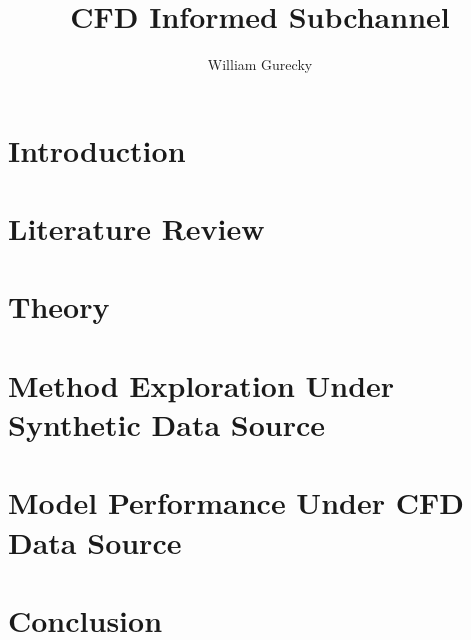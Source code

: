 \documentclass[12pt,a4paper]{report}
\author{William Gurecky}
\title{CFD Informed Subchannel}
\begin{document}








\onehalfspacing
\chapter{Introduction}
\label{chap:intro}


\chapter{Literature Review}
\label{chap:lit}


\chapter{Theory}
\label{chap:theory}


\chapter{Method Exploration Under Synthetic Data Source}
\label{chap:work}



\chapter{Model Performance Under CFD Data Source}
\label{chap:fw}


\chapter{Conclusion}
\label{chap:conc}

\end{document}

